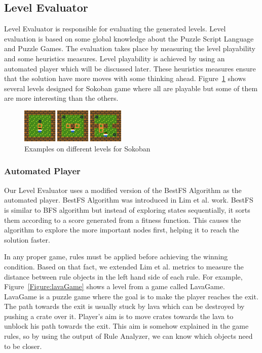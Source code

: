 \documentclass[letterpaper]{article}
\newcommand{\figref}[1]{Figure~\ref{Figure:#1}}
\begin{document}
\subsection{Level Evaluator}
Level Evaluator is responsible for evaluating the generated levels. Level evaluation is based on some global knowledge about the Puzzle Script Language and Puzzle Games. The evaluation takes place by measuring the level playability and some heuristics measures. Level playability is achieved by using an automated player which will be discussed later. These heuristics measures ensure that the solution have more moves with some thinking ahead. \figref{diffLevelsSokoban} shows several levels designed for Sokoban game where all are playable but some of them are more interesting than the others.
\begin{figure}[ht]
  	\centering
    \includegraphics[width=0.45\textwidth]{Images/diffLevelsSokoban}
    \caption{Examples on different levels for Sokoban}
    \label{Figure:diffLevelsSokoban}
\end{figure}

\subsubsection{Automated Player}
Our Level Evaluator uses a modified version of the BestFS Algorithm as the automated player. BestFS Algorithm was introduced in Lim et al.\cite{puzzleScriptGeneration} work. BestFS is similar to BFS algorithm but instead of exploring states sequentially, it sorts them according to a score generated from a fitness function. This causes the algorithm to explore the more important nodes first, helping it to reach the solution faster.\\\par

In any proper game, rules must be applied before achieving the winning condition. Based on that fact, we extended Lim et al. metrics to measure the distance between rule objects in the left hand side of each rule. For example, \figref{lavaGame} shows a level from a game called LavaGame. LavaGame is a puzzle game where the goal is to make the player reaches the exit. The path towards the exit is usually stuck by lava which can be destroyed by pushing a crate over it. Player's aim is to move crates towards the lava to unblock his path towards the exit. This aim is somehow explained in the game rules, so by using the output of Rule Analyzer, we can know which objects need to be closer.
\end{document}
